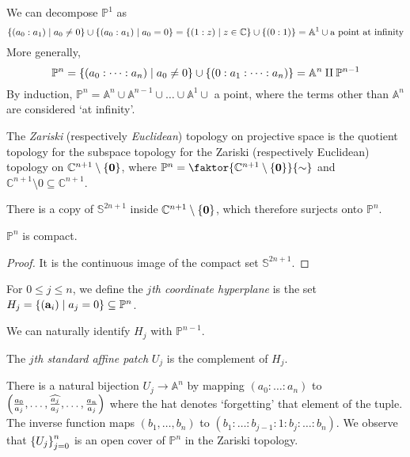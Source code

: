 We can decompose \( \mathbb P^1 \) as
\[ \qty{(a_0 : a_1) \mid a_0 \neq 0} \cup \qty{(a_0 : a_1) \mid a_0 = 0} = \qty{\qty(1 : z) \mid z \in \mathbb C} \cup \qty{(0 : 1)} = \mathbb A^1 \cup \text{a point at infinity} \]
More generally,
\[ \mathbb P^n = \qty{(a_0 : \dots : a_n) \mid a_0 \neq 0} \cup \qty{(0 : a_1 : \dots : a_n)} = \mathbb A^n \amalg \mathbb P^{n-1} \]
By induction, \( \mathbb P^n = \mathbb A^n \cup \mathbb A^{n-1} \cup \dots \cup \mathbb A^1 \cup \) a point, where the terms other than \( \mathbb A^n \) are considered `at infinity'.
\begin{definition}
    The \emph{Zariski} (respectively \emph{Euclidean}) topology on projective space is the quotient topology for the subspace topology for the Zariski (respectively Euclidean) topology on \( \mathbb C^{n+1} \setminus \qty{\vb 0} \), where \( \mathbb P^n = \faktor{\mathbb C^{n+1} \setminus \qty{\vb 0}}{\sim} \) and \( \mathbb C^{n+1} \setminus \qty{0} \subseteq \mathbb C^{n+1} \).
\end{definition}
There is a copy of \( \mathbb S^{2n+1} \) inside \( \mathbb C^{n+1} \setminus \qty{\vb 0} \), which therefore surjects onto \( \mathbb P^n \).
\begin{corollary}
    \( \mathbb P^n \) is compact.
\end{corollary}
\begin{proof}
    It is the continuous image of the compact set \( \mathbb S^{2n+1} \).
\end{proof}
\begin{definition}
    For \( 0 \leq j \leq n \), we define the \emph{\( j \)th coordinate hyperplane} is the set \( H_j = \qty{(\vb a_i) \mid a_j = 0} \subseteq \mathbb P^n \).
\end{definition}
We can naturally identify \( H_j \) with \( \mathbb P^{n-1} \).
\begin{definition}
    The \emph{\( j \)th standard affine patch} \( U_j \) is the complement of \( H_j \). 
\end{definition}
There is a natural bijection \( U_j \to \mathbb A^n \) by mapping \( (a_0 : \dots : a_n) \) to \( \qty(\frac{a_0}{a_j}, \dots, \widehat{\frac{a_j}{a_j}}, \dots, \frac{a_n}{a_j}) \) where the hat denotes `forgetting' that element of the tuple.
The inverse function maps \( (b_1, \dots, b_n) \) to \( (b_1 : \dots : b_{j-1} : 1 : b_j : \dots : b_n) \).
We observe that \( \qty{U_j}_{j=0}^n \) is an open cover of \( \mathbb P^n \) in the Zariski topology.

